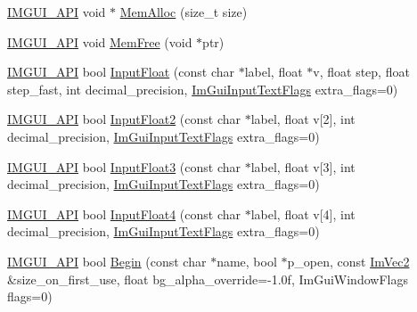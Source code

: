\begin{DoxyCompactItemize}
\item 
\mbox{\hyperlink{imgui_8h_a43829975e84e45d1149597467a14bbf5}{I\+M\+G\+U\+I\+\_\+\+A\+PI}} void $\ast$ \mbox{\hyperlink{namespace_im_gui_aed896913f2e140cd0ad7431060dba50b}{Mem\+Alloc}} (size\+\_\+t size)
\item 
\mbox{\hyperlink{imgui_8h_a43829975e84e45d1149597467a14bbf5}{I\+M\+G\+U\+I\+\_\+\+A\+PI}} void \mbox{\hyperlink{namespace_im_gui_a269ec695c6e722ec3da85dae37f0675d}{Mem\+Free}} (void $\ast$ptr)
\item 
\mbox{\hyperlink{imgui_8h_a43829975e84e45d1149597467a14bbf5}{I\+M\+G\+U\+I\+\_\+\+A\+PI}} bool \mbox{\hyperlink{namespace_im_gui_a15edd4acce19b15d9309d3cab51445be}{Input\+Float}} (const char $\ast$label, float $\ast$v, float step, float step\+\_\+fast, int decimal\+\_\+precision, \mbox{\hyperlink{imgui_8h_a7d2c6153a6b9b5d3178ce82434ac9fb8}{Im\+Gui\+Input\+Text\+Flags}} extra\+\_\+flags=0)
\item 
\mbox{\hyperlink{imgui_8h_a43829975e84e45d1149597467a14bbf5}{I\+M\+G\+U\+I\+\_\+\+A\+PI}} bool \mbox{\hyperlink{namespace_im_gui_a320460d1aa6c93f09ef77d6532a013db}{Input\+Float2}} (const char $\ast$label, float v\mbox{[}2\mbox{]}, int decimal\+\_\+precision, \mbox{\hyperlink{imgui_8h_a7d2c6153a6b9b5d3178ce82434ac9fb8}{Im\+Gui\+Input\+Text\+Flags}} extra\+\_\+flags=0)
\item 
\mbox{\hyperlink{imgui_8h_a43829975e84e45d1149597467a14bbf5}{I\+M\+G\+U\+I\+\_\+\+A\+PI}} bool \mbox{\hyperlink{namespace_im_gui_acc969c47f54c63f94bee997a51fca39d}{Input\+Float3}} (const char $\ast$label, float v\mbox{[}3\mbox{]}, int decimal\+\_\+precision, \mbox{\hyperlink{imgui_8h_a7d2c6153a6b9b5d3178ce82434ac9fb8}{Im\+Gui\+Input\+Text\+Flags}} extra\+\_\+flags=0)
\item 
\mbox{\hyperlink{imgui_8h_a43829975e84e45d1149597467a14bbf5}{I\+M\+G\+U\+I\+\_\+\+A\+PI}} bool \mbox{\hyperlink{namespace_im_gui_aba9f9d8922403f96ca246c65e4929198}{Input\+Float4}} (const char $\ast$label, float v\mbox{[}4\mbox{]}, int decimal\+\_\+precision, \mbox{\hyperlink{imgui_8h_a7d2c6153a6b9b5d3178ce82434ac9fb8}{Im\+Gui\+Input\+Text\+Flags}} extra\+\_\+flags=0)
\item 
\mbox{\hyperlink{imgui_8h_a43829975e84e45d1149597467a14bbf5}{I\+M\+G\+U\+I\+\_\+\+A\+PI}} bool \mbox{\hyperlink{namespace_im_gui_a288e01ff1c8102d6374a6b1e409b9878}{Begin}} (const char $\ast$name, bool $\ast$p\+\_\+open, const \mbox{\hyperlink{struct_im_vec2}{Im\+Vec2}} \&size\+\_\+on\+\_\+first\+\_\+use, float bg\+\_\+alpha\+\_\+override=-\/1.\+0f, Im\+Gui\+Window\+Flags flags=0)

\end{DoxyCompactItemize}

